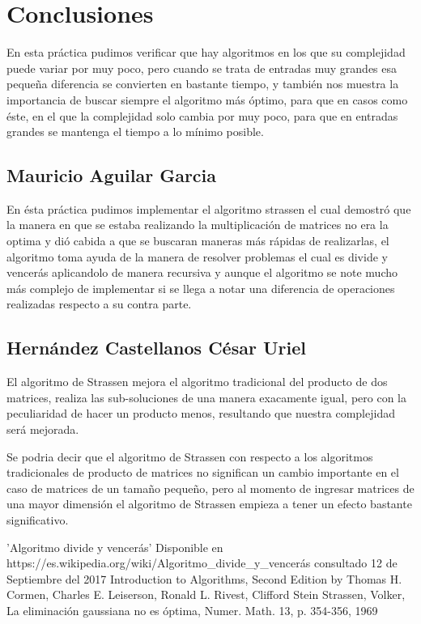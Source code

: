 \documentclass[a4paper]{article}
\begin{document}
\section{Conclusiones}
    	En esta pr\'{a}ctica pudimos verificar que hay algoritmos en los que su complejidad puede variar por muy poco, pero cuando se trata de entradas muy grandes esa pequeña diferencia se convierten en bastante tiempo, y también nos muestra la importancia de buscar siempre el algoritmo más óptimo, para que en casos como éste, en el que la complejidad solo cambia por muy poco, para que en entradas grandes se mantenga el tiempo a lo mínimo posible.
\subsection{Mauricio Aguilar Garcia }
    En ésta práctica pudimos implementar el algoritmo strassen el cual demostró que la manera en que se estaba realizando la multiplicación de matrices no era la optima y dió cabida a que se buscaran maneras más rápidas de realizarlas, el algoritmo toma ayuda de la manera de resolver problemas el cual es divide y vencerás aplicandolo de manera recursiva y aunque el algoritmo se note mucho más complejo de implementar si se llega a notar una diferencia de operaciones realizadas respecto a su contra parte.
    \subsection{Hern\'andez Castellanos C\'esar Uriel}
    
    El algoritmo de Strassen mejora el algoritmo tradicional del producto de dos matrices, realiza las sub-soluciones de una manera exacamente igual, pero con la peculiaridad de hacer un producto menos, resultando que nuestra complejidad será mejorada.
    
    Se podria decir que el algoritmo de Strassen con respecto a los algoritmos tradicionales de producto de matrices no significan un cambio importante en el caso de matrices de un tamaño pequeño, pero al momento de ingresar matrices de una mayor dimensión el algoritmo de Strassen empieza a tener un efecto bastante significativo.
	

\begin{thebibliography}{9}
 'Algoritmo divide y vencerás' Disponible en 
 https://es.wikipedia.org/wiki/Algoritmo\_divide\_y\_vencerás consultado 12 de Septiembre del 2017
 Introduction to Algorithms, Second Edition by Thomas H. Cormen, Charles E. Leiserson, Ronald L. Rivest, Clifford Stein
 Strassen, Volker, La eliminación gaussiana no es óptima, Numer. Math. 13, p. 354-356, 1969
\end{thebibliography}
\end{document}
